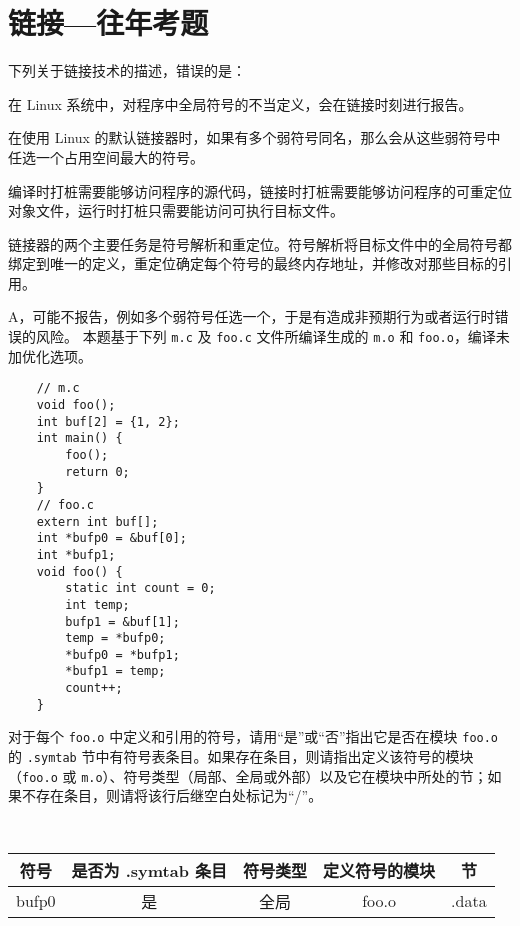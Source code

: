 \chapter{链接{---}往年考题}\thispagestyle{empty}
    \begin{problems}
         下列关于链接技术的描述，错误的是：
        \begin{choices}
            \item 在 Linux 系统中，对程序中全局符号的不当定义，会在链接时刻进行报告。
            \item 在使用 Linux 的默认链接器时，如果有多个弱符号同名，那么会从这些弱符号中任选一个占用空间最大的符号。
            \item 编译时打桩需要能够访问程序的源代码，链接时打桩需要能够访问程序的可重定位对象文件，运行时打桩只需要能访问可执行目标文件。
            \item 链接器的两个主要任务是符号解析和重定位。符号解析将目标文件中的全局符号都绑定到唯一的定义，重定位确定每个符号的最终内存地址，并修改对那些目标的引用。
        \end{choices}
        \sol A，可能不报告，例如多个弱符号任选一个，于是有造成非预期行为或者运行时错误的风险。
         本题基于下列 \verb|m.c| 及 \verb|foo.c| 文件所编译生成的 \verb|m.o| 和 \verb|foo.o|，编译未加优化选项。
        \begin{verbatim}
    // m.c
    void foo();
    int buf[2] = {1, 2};
    int main() {
        foo();
        return 0;
    }
    // foo.c
    extern int buf[];
    int *bufp0 = &buf[0];
    int *bufp1;
    void foo() {
        static int count = 0;
        int temp;
        bufp1 = &buf[1];
        temp = *bufp0;
        *bufp0 = *bufp1;
        *bufp1 = temp;
        count++;
    }
        \end{verbatim}
        \qn 对于每个 \verb|foo.o| 中定义和引用的符号，请用“是”或“否”指出它是否在模块 \verb|foo.o| 的 \verb|.symtab| 节中有符号表条目。如果存在条目，则请指出定义该符号的模块（\verb|foo.o| 或 \verb|m.o|）、符号类型（局部、全局或外部）以及它在模块中所处的节；如果不存在条目，则请将该行后继空白处标记为“/”。
        \begin{table}[H]
            \tt
            \centering
            \begin{tabular}{|c|c|c|c|c|}
                \hline
                符号 & 是否为 .symtab 条目 & 符号类型 & 定义符号的模块 & 节 \\ \hline
                bufp0 & 是 & 全局 & foo.o & .data \\ \hline

\end{tabular}
\end{table}
\end{problems}
